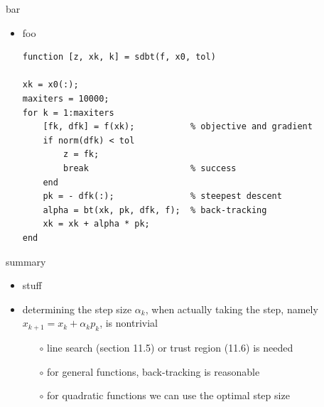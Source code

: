 \documentclass[10pt,hyperref]{beamer}
\begin{document}
\begin{frame}[fragile]{bar}

\begin{itemize}
\item foo
\begin{Verbatim}[fontsize=\small]
function [z, xk, k] = sdbt(f, x0, tol)

xk = x0(:);
maxiters = 10000;
for k = 1:maxiters
    [fk, dfk] = f(xk);           % objective and gradient
    if norm(dfk) < tol
        z = fk;
        break                    % success
    end
    pk = - dfk(:);               % steepest descent
    alpha = bt(xk, pk, dfk, f);  % back-tracking
    xk = xk + alpha * pk;
end
\end{Verbatim}
\end{itemize}
\end{frame}





\begin{frame}{summary}

\begin{itemize}
\item stuff
\item determining the step size $\alpha_k$, when actually taking the step, namely $x_{k+1}=x_k + \alpha_k p_k$, is nontrivial
    \begin{itemize}
    \item[$\circ$] line search (section 11.5) or trust region (11.6) is needed
    \item[$\circ$] for general functions, back-tracking is reasonable
    \item[$\circ$] for quadratic functions we can use the optimal step size
    \end{itemize}
\end{itemize}
\end{frame}
\end{document}
